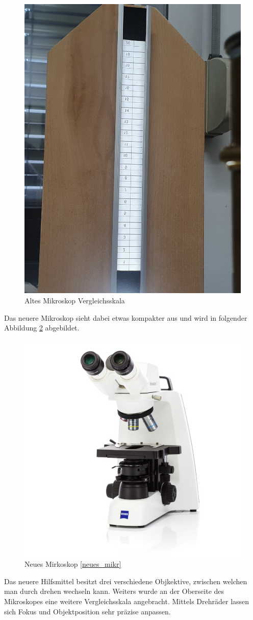 \documentclass[12pt,a4paper,twoside]{article}
\begin{document}
    \begin{figure}[H]
        \centering
        \includegraphics[width=0.5\linewidth, angle=-90]{nudes/AltesMikroMessskala.jpg}
        \caption{Altes Mikroskop Vergleichsskala}
        \label{fig:Altes Mikroskop Skala}
    \end{figure}

    \noindent
    Das neuere Mikroskop sieht dabei etwas kompakter aus und wird in folgender Abbildung \ref{fig:Neues Mirkoskop} abgebildet.

    \begin{figure}[H]
        \centering
        \includegraphics[width=0.5\linewidth, angle=0]{nudes/neues_mikroskop.jpg}
        \caption{Neues Mirkoskop \ref{neues_mikr}}
        \label{fig:Neues Mirkoskop}
    \end{figure}

    \noindent
    Das neuere Hilfsmittel besitzt drei verschiedene Objkektive, zwischen welchen man durch drehen wechseln kann. Weiters wurde an der Oberseite des Mikroskopes eine weitere Vergleichsskala angebracht.
    Mittels Drehräder lassen sich Fokus und Objektposition sehr präzise anpassen. \newline
    
\end{document}
